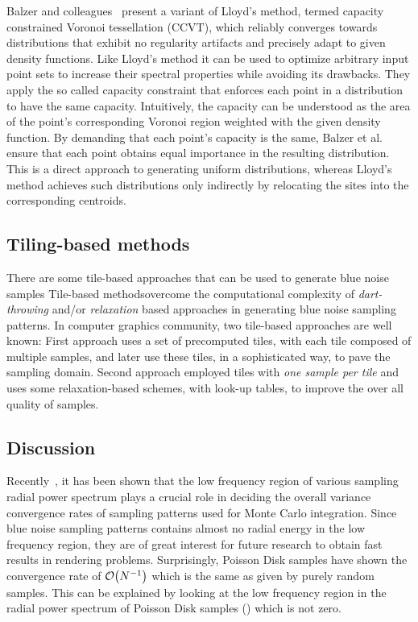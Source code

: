 Balzer and colleagues~\cite{Balzer:2009:CPD:1531326.1531392} present a variant of Lloyd’s method, termed capacity constrained Voronoi 
tessellation (CCVT), which reliably converges towards distributions that exhibit no regularity artifacts and precisely adapt 
to given density functions. Like Lloyd’s 
method it can be used to optimize arbitrary input point sets to increase their spectral properties while avoiding its 
drawbacks. They apply the so called capacity constraint that enforces each point in a distribution to have the same 
capacity. Intuitively, the capacity can be understood as the area of the point’s corresponding Voronoi region weighted with 
the given density function. By demanding that each point’s capacity is the same, Balzer et al. ensure that each point 
obtains equal importance in the resulting distribution. This is a direct approach to generating uniform 
distributions, whereas Lloyd’s method achieves such distributions only indirectly by relocating the sites into the 
corresponding centroids.

\subsection{Tiling-based methods}

There are some tile-based approaches that can be used to generate blue noise samples 
Tile-based methodsovercome the computational complexity of  
\emph{dart-throwing} and/or \emph{relaxation} based approaches in generating blue noise sampling patterns. In computer graphics community, two tile-based approaches are well known: First approach uses a set of precomputed tiles, with each tile composed of multiple samples, and later use these tiles, in a sophisticated way, to pave the sampling domain. Second approach employed tiles with \emph{one sample per tile} and uses some relaxation-based schemes, with look-up tables, to improve the over all quality of samples. 

\subsection{Discussion}

Recently~\cite{Pilleboue:2015:VAM}, it has been shown that the low frequency region of various sampling 
radial power spectrum plays a crucial role in deciding the overall variance convergence rates of sampling 
patterns used for Monte Carlo integration. Since blue noise sampling patterns contains almost no radial 
energy in the low frequency region, they are of great interest for future research to obtain fast results in 
rendering problems. Surprisingly, Poisson Disk samples have shown the convergence rate of $\mathcal{O}\!\left(N^{-1}\right)$ which is the same as given by purely random samples. This can be explained by looking at the low frequency region in the radial power spectrum of Poisson Disk samples () which is not zero.
